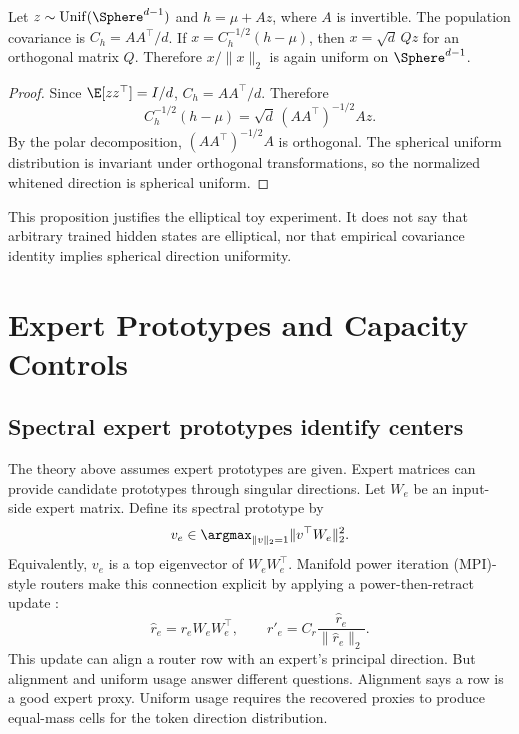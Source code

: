 \begin{proposition}
\label{prop:whitening}
Let $z\sim\mathrm{Unif}(\Sphere^{d-1})$ and $h=\mu+Az$, where $A$ is invertible.
The population covariance is $C_h=AA^\top/d$. If $x=C_h^{-1/2}(h-\mu)$, then
$x=\sqrt d\,Qz$ for an orthogonal matrix $Q$. Therefore $x/\|x\|_2$ is again
uniform on $\Sphere^{d-1}$.
\end{proposition}

\begin{proof}
Since $\E[zz^\top]=I/d$, $C_h=AA^\top/d$. Therefore
\begin{equation}
 C_h^{-1/2}(h-\mu)
 =\sqrt d\,(AA^\top)^{-1/2}Az.
\end{equation}
By the polar decomposition, $(AA^\top)^{-1/2}A$ is orthogonal. The spherical
uniform distribution is invariant under orthogonal transformations, so the
normalized whitened direction is spherical uniform.
\end{proof}

This proposition justifies the elliptical toy experiment. It does not say that
arbitrary trained hidden states are elliptical, nor that empirical covariance
identity implies spherical direction uniformity.

\section{Expert Prototypes and Capacity Controls}

\subsection{Spectral expert prototypes identify centers}

The theory above assumes expert prototypes are given. Expert matrices can
provide candidate prototypes through singular directions. Let $W_e$ be an
input-side expert matrix. Define its spectral prototype by
\begin{equation}
 v_e\in\argmax_{\|v\|_2=1}\|v^\top W_e\|_2^2.
\end{equation}
Equivalently, $v_e$ is a top eigenvector of $W_eW_e^\top$. Manifold power
iteration (MPI)-style routers make this connection explicit by applying a
power-then-retract update \citep{routermpi2026}:
\begin{equation}
 \widehat r_e=r_eW_eW_e^\top,
 \qquad
 r'_e=C_r\frac{\widehat r_e}{\|\widehat r_e\|_2}.
\end{equation}
This update can align a router row with an expert's principal direction. But
alignment and uniform usage answer different questions. Alignment says a row is
a good expert proxy. Uniform usage requires the recovered proxies to produce
equal-mass cells for the token direction distribution.

